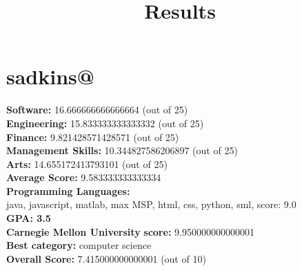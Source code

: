 \documentclass{article}
\title{Results}
\begin{document}
\section{sadkins@}
\textbf{Software:} 16.666666666666664 (out of 25)\\
\textbf{Engineering: } 15.833333333333332 (out of 25)\\
\textbf{Finance:} 9.821428571428571 (out of 25)\\
\textbf{Management Skills:} 10.344827586206897 (out of 25)\\
\textbf{Arts:} 14.655172413793101 (out of 25)\\
\textbf{Average Score: } 9.583333333333334\\
\textbf{Programming Languages:} \\
java, javascript, matlab, max MSP, html, css, python, sml, score: 9.0\\
\textbf{GPA: 3.5}\\
\textbf{Carnegie Mellon University} \textbf{score:} 9.950000000000001\\
\textbf{Best category: } computer science\\
\textbf{Overall Score: }7.415000000000001 (out of 10)
\end{document}
